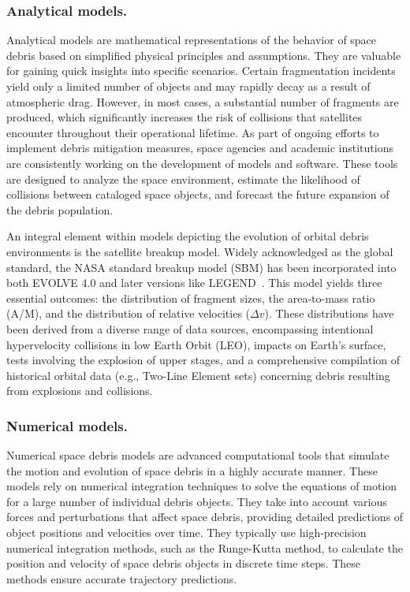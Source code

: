 \documentclass[11pt]{article} %
\begin{document}
\subsubsection{Analytical models.}

Analytical models are mathematical representations of the behavior of space debris based on simplified physical principles and assumptions. They are valuable for gaining quick insights into specific scenarios. Certain fragmentation incidents yield only a limited number of objects and may rapidly decay as a result of atmospheric drag. However, in most cases, a substantial number of fragments are produced, which significantly increases the risk of collisions that satellites encounter throughout their operational lifetime. As part of ongoing efforts to implement debris mitigation measures, space agencies and academic institutions are consistently working on the development of models and software. These tools are designed to analyze the space environment, estimate the likelihood of collisions between cataloged space objects, and forecast the future expansion of the debris population.

An integral element within models depicting the evolution of orbital debris environments is the satellite breakup model. Widely acknowledged as the global standard, the NASA standard breakup model (SBM) has been incorporated into both EVOLVE 4.0 and later versions like LEGEND~\cite{johnson_nasas_2001}. This model yields three essential outcomes: the distribution of fragment sizes, the area-to-mass ratio (A/M), and the distribution of relative velocities ($\Delta{v}$). These distributions have been derived from a diverse range of data sources, encompassing intentional hypervelocity collisions in low Earth Orbit (LEO), impacts on Earth's surface, tests involving the explosion of upper stages, and a comprehensive compilation of historical orbital data (e.g., Two-Line Element sets) concerning debris resulting from explosions and collisions.

\subsubsection{Numerical models.}

Numerical space debris models are advanced computational tools that simulate the motion and evolution of space debris in a highly accurate manner. These models rely on numerical integration techniques to solve the equations of motion for a large number of individual debris objects. They take into account various forces and perturbations that affect space debris, providing detailed predictions of object positions and velocities over time. They typically use high-precision numerical integration methods, such as the Runge-Kutta method, to calculate the position and velocity of space debris objects in discrete time steps. These methods ensure accurate trajectory predictions.
\end{document}
